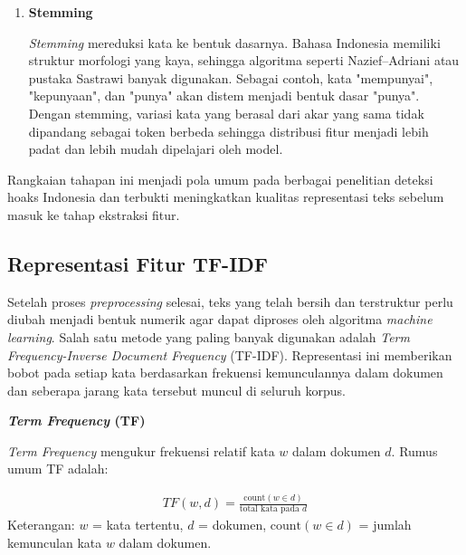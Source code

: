 \begin{enumerate}
	\textit{Stopword removal} menghapus kata-kata yang sangat sering muncul tetapi tidak membantu membedakan dokumen. Kata seperti "yang", "adalah", "itu", "dan", atau "untuk" biasanya dimasukkan ke dalam daftar stopword bahasa Indonesia. Dengan menghilangkan kata-kata ini, model dapat lebih fokus pada kata yang membawa makna spesifik. \textcite{pratiwi2022hoax} juga menggunakan daftar stopword Indonesia sebagai bagian dari \textit{pipeline} \textit{preprocessing} mereka.\\

	\item \textbf{Stemming}  

	\textit{Stemming} mereduksi kata ke bentuk dasarnya. Bahasa Indonesia memiliki struktur morfologi yang kaya, sehingga algoritma seperti Nazief--Adriani atau pustaka Sastrawi banyak digunakan. Sebagai contoh, kata "mempunyai", "kepunyaan", dan "punya" akan distem menjadi bentuk dasar "punya". Dengan stemming, variasi kata yang berasal dari akar yang sama tidak dipandang sebagai token berbeda sehingga distribusi fitur menjadi lebih padat dan lebih mudah dipelajari oleh model.\\
\end{enumerate}

Rangkaian tahapan ini menjadi pola umum pada berbagai penelitian deteksi hoaks Indonesia dan terbukti meningkatkan kualitas representasi teks sebelum masuk ke tahap ekstraksi fitur.

\subsection{Representasi Fitur TF-IDF}

Setelah proses \textit{preprocessing} selesai, teks yang telah bersih dan terstruktur perlu diubah menjadi bentuk numerik agar dapat diproses oleh algoritma \textit{machine learning}. Salah satu metode yang paling banyak digunakan adalah \textit{Term Frequency-Inverse Document Frequency} (TF-IDF). Representasi ini memberikan bobot pada setiap kata berdasarkan frekuensi kemunculannya dalam dokumen dan seberapa jarang kata tersebut muncul di seluruh korpus.

\textbf{\textit{Term Frequency} (TF)}  

\textit{Term Frequency} mengukur frekuensi relatif kata $w$ dalam dokumen $d$. Rumus umum TF adalah:

\begin{align}
TF(w,d) = \frac{\text{count}(w \in d)}{\text{total kata pada } d} \label{eq=rumus-tf}
\end{align}
Keterangan:  
$w$ = kata tertentu,  
$d$ = dokumen,  
$\text{count}(w \in d)$ = jumlah kemunculan kata $w$ dalam dokumen.

